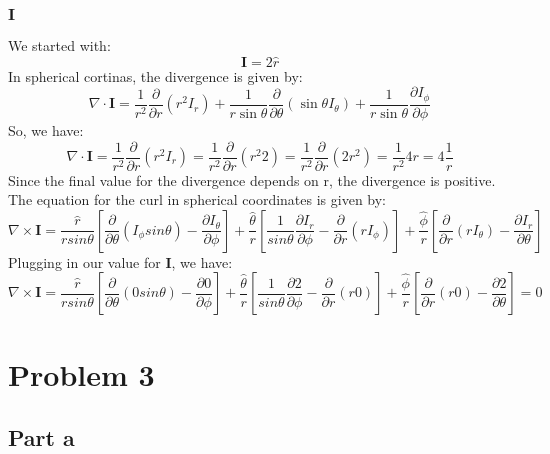 \documentclass{article}
\begin{document}
\subsubsection{$\mathbf{I}$}
We started with:
\begin{equation}
    \mathbf{I}=2\hat{r}   
\end{equation}
In spherical cortinas, the divergence is given by:
\begin{equation}
    \nabla \cdot \mathbf{I} = \frac{1}{r^{2}}\frac{\partial}{\partial r}(r^{2}I_r) + \frac{1}{r\sin\theta}\frac{\partial}{\partial \theta}(\sin\theta I_{\theta}) + \frac{1}{r\sin\theta}\frac{\partial I_{\phi}}{\partial \phi}
\end{equation}
So, we have:
\begin{equation}
    \nabla \cdot \mathbf{I} = \frac{1}{r^{2}}\frac{\partial}{\partial r}(r^{2}I_r)=\frac{1}{r^{2}}\frac{\partial}{\partial r}(r^{2}2)=\frac{1}{r^{2}}\frac{\partial}{\partial r}(2r^{2})=\frac{1}{r^{2}}4r=4\frac{1}{r}
\end{equation}
Since the final value for the divergence depends on r, the divergence is positive.\\
The equation for the curl in spherical coordinates is given by:
\begin{equation}
    \nabla \times \mathbf{I} = \frac{\hat{r}}{r sin\theta}\left[\frac{\partial}{\partial \theta}(I_{\phi}sin\theta)-\frac{\partial I_{\theta}}{\partial \phi}\right]+\frac{\hat{\theta}}{r}\left[\frac{1}{sin\theta}\frac{\partial I_r}{\partial \phi}-\frac{\partial}{\partial r}(rI_{\phi})\right]+\frac{\hat{\phi}}{r}\left[\frac{\partial}{\partial r}(rI_{\theta})-\frac{\partial I_r}{\partial \theta}\right]
\end{equation}
Plugging in our value for $\mathbf{I}$, we have:
\begin{equation}
    \nabla \times \mathbf{I} = \frac{\hat{r}}{r sin\theta}\left[\frac{\partial}{\partial \theta}(0sin\theta)-\frac{\partial 0}{\partial \phi}\right]+\frac{\hat{\theta}}{r}\left[\frac{1}{sin\theta}\frac{\partial 2}{\partial \phi}-\frac{\partial}{\partial r}(r0)\right]+\frac{\hat{\phi}}{r}\left[\frac{\partial}{\partial r}(r0)-\frac{\partial 2}{\partial \theta}\right]=0
\end{equation}

\section{Problem 3}
\subsection{Part a}
\end{document}
